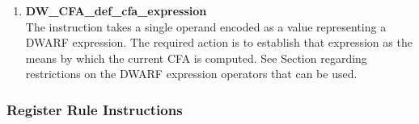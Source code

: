 \begin{enumerate}[1.]
\item \textbf{DW\-\_CFA\-\_def\-\_cfa\-\_expression} \\
The  instruction takes a single
operand encoded as a  value representing a
DWARF expression. The required action is to establish that
expression as the means by which the current CFA is computed.
See 
Section  
regarding restrictions on the DWARF
expression operators that can be used.

\end{enumerate}

\subsubsection{Register Rule Instructions}
\label{chap:registerruleinstructions}

